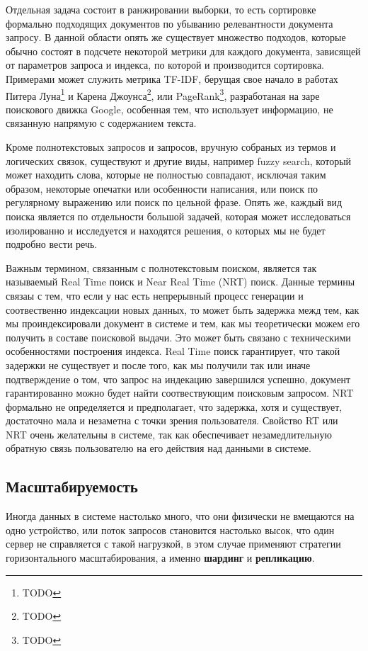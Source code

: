 Отдельная задача состоит в ранжировании выборки, то есть сортировке формально подходящих документов по убыванию релевантности документа запросу. В данной области опять же существует множество подходов, которые обычно состоят в подсчете некоторой метрики для каждого документа, зависящей от параметров запроса и индекса, по которой и производится сортировка. Примерами может служить метрика TF-IDF, берущая свое начало в работах Питера Луна\footnote{TODO} и Карена Джоунса\footnote{TODO}, или PageRank\footnote{TODO}, разработаная на заре поискового движка Google, особенная тем, что использует информацию, не связанную напрямую с содержанием текста.

Кроме полнотекстовых запросов и запросов, вручную собраных из термов и логических связок, существуют и другие виды, например fuzzy search, который может находить слова, которые не полностью совпадают, исключая таким образом, некоторые опечатки или особенности написания, или поиск по регулярному выражению или поиск по цельной фразе. Опять же, каждый вид поиска является по отдельности большой задачей, которая может исследоваться изолированно и исследуется и находятся решения, о которых мы не будет подробно вести речь.

Важным термином, связанным с полнотекстовым поиском, является так называемый Real Time поиск и Near Real Time (NRT) поиск. Данные термины связаы с тем, что если у нас есть непрерывный процесс генерации и соотвественно индексации новых данных, то может быть задержка межд тем, как мы проиндексировали документ в системе и тем, как мы теоретически можем его получить в составе поисковой выдачи. Это может быть связано с техническими особенностями построения индекса. Real Time поиск гарантирует, что такой задержки не существует и после того, как мы получили так или иначе подтверждение о том, что запрос на индекацию завершился успешно, документ гарантированно можно будет найти соотвествующим поисковым запросом. NRT формально не определяется и предполагает, что задержка, хотя и существует, достаточно мала и незаметна с точки зрения пользователя. Свойство RT или NRT очень желательны в системе, так как обеспечивает незамедлительную обратную связь пользователю на его действия над данными в системе.

\subsection{Масштабируемость}

Иногда данных в системе настолько много, что они физически не вмещаются на одно устройство, или поток запросов становится настолько высок, что один сервер не справляется с такой нагрузкой, в этом случае применяют стратегии горизонтального масштабирования, а именно \textbf{шардинг} и \textbf{репликацию}.

